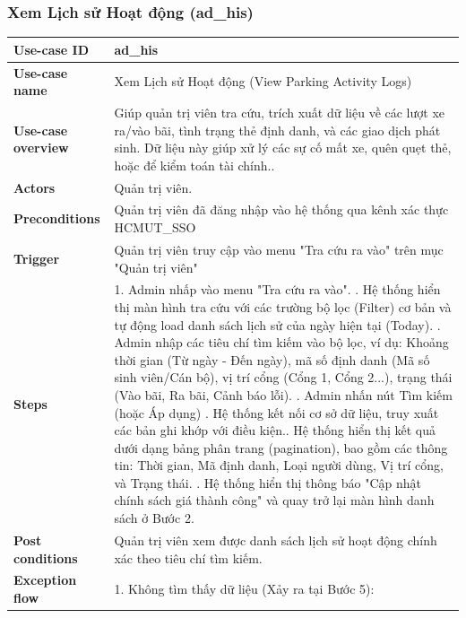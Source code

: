 \subsubsection{Xem Lịch sử Hoạt động (ad\_his)}
\begingroup
\small
\begin{longtable}{|>{\centering\arraybackslash}m{3cm}|m{13.7cm}|}
\hline
\textbf{Use-case ID} & ad\_his \\ \hline
\textbf{Use-case name} & Xem Lịch sử Hoạt động (View Parking Activity Logs) \\ \hline
\textbf{Use-case overview} & Giúp quản trị viên tra cứu, trích xuất dữ liệu về các lượt xe ra/vào bãi, tình trạng thẻ định danh, và các giao dịch phát sinh. Dữ liệu này giúp xử lý các sự cố mất xe, quên quẹt thẻ, hoặc để kiểm toán tài chính.. \\ \hline
\textbf{Actors} & Quản trị viên. \\ \hline
\textbf{Preconditions} & Quản trị viên đã đăng nhập vào hệ thống qua kênh xác thực HCMUT\_SSO \\ \hline
\textbf{Trigger} & Quản trị viên truy cập vào menu "Tra cứu ra vào" trên mục "Quản trị viên" \\ \hline
\textbf{Steps} & 
1. Admin nhấp vào menu "Tra cứu ra vào". \newline
2. Hệ thống hiển thị màn hình tra cứu với các trường bộ lọc (Filter) cơ bản và tự động load danh sách lịch sử của ngày hiện tại (Today). \newline
3. Admin nhập các tiêu chí tìm kiếm vào bộ lọc, ví dụ: Khoảng thời gian (Từ ngày - Đến ngày), mã số định danh (Mã số sinh viên/Cán bộ), vị trí cổng (Cổng 1, Cổng 2...), trạng thái (Vào bãi, Ra bãi, Cảnh báo lỗi). \newline
4. Admin nhấn nút Tìm kiếm (hoặc Áp dụng) \newline
5. Hệ thống kết nối cơ sở dữ liệu, truy xuất các bản ghi khớp với điều kiện.\newline
6. Hệ thống hiển thị kết quả dưới dạng bảng phân trang (pagination), bao gồm các thông tin: Thời gian, Mã định danh, Loại người dùng, Vị trí cổng, và Trạng thái. \newline
7. Hệ thống hiển thị thông báo "Cập nhật chính sách giá thành công" và quay trở lại màn hình danh sách ở Bước 2.\\ \hline
\textbf{Post conditions} & Quản trị viên xem được danh sách lịch sử hoạt động chính xác theo tiêu chí tìm kiếm.\\ \hline
\textbf{Exception flow} & 
1. Không tìm thấy dữ liệu (Xảy ra tại Bước 5): \newline

\end{longtable}
